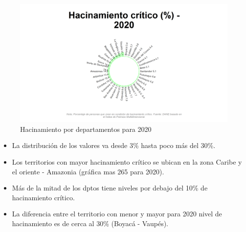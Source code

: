     \begin{figure}[H]
        \caption{Hacinamiento por departamentos para 2020 \label{map_result_2} }
        \begin{center}
        \includegraphics[width=\textwidth,keepaspectratio]{img/var_265_static.png}
        \end{center}
    \end{figure}
            \begin{itemize}
                    \item La distribución de los valores va desde 3\% hasta poco más del 30\%.
                    \item Los territorios con mayor hacinamiento crítico se ubican en la zona Caribe y el oriente - Amazonia (gráfica mas 265 para 2020).
                    \item Más de la mitad de los dptos tiene niveles por debajo del 10\% de hacinamiento crítico.
                    \item La diferencia entre el territorio con menor y mayor para 2020 nivel de hacinamiento es de cerca al 30\% (Boyacá - Vaupés).
                    \end{itemize}

